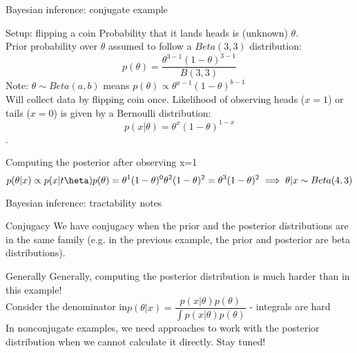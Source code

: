 \documentclass[10pt]{beamer}
\begin{document}
\begin{frame}{Bayesian inference: conjugate example}

\begin{sblock}{Setup: flipping a coin}
Probability that it lands heads is (unknown) $\theta$. \\
Prior probability over $\theta$ assumed to follow a $Beta(3,3)$ distribution:
$$ p(\theta) = \frac{\theta^{3-1}(1-\theta)^{3-1}}{B(3,3)}$$
Note: $\theta \sim Beta(a, b)$ means $p(\theta) \propto \theta^{a-1}(1-\theta)^{b-1}$\\
Will collect data by flipping coin once. Likelihood of observing heads ($x=1$) or tails ($x=0$) is given by a Bernoulli distribution:
$$p(x | \theta) = \theta^x(1-\theta)^{1-x} $$.
\end{sblock}
\begin{sblock}{Computing the posterior after observing x=1}
$$p(\theta| x) \propto p(x | t\heta) p(\theta) = \theta^1(1-\theta)^{0}  \theta^{2}(1-\theta)^{2}  = \theta^3 (1-\theta)^2 \implies \theta | x \sim Beta(4,3)$$
\end{sblock}

\end{frame}


\begin{frame}{Bayesian inference: tractability notes}

\begin{sblock}{Conjugacy}
We have conjugacy when the prior and the posterior distributions are in the same family (e.g. in the previous example, the prior and posterior are beta distributions).
\end{sblock}

\begin{sblock}{Generally}
Generally, computing the posterior distribution is much harder than in this example!\\
Consider the denominator in$ p(\theta | x) = \dfrac{p(x | \theta) p(\theta)}{\int p(x | \theta) p(\theta)}  $  - integrals are hard \\
In nonconjugate examples, we need approaches to work with the posterior distribution when we cannot calculate it directly. Stay tuned!
\end{sblock}

\end{frame}




\end{document}

